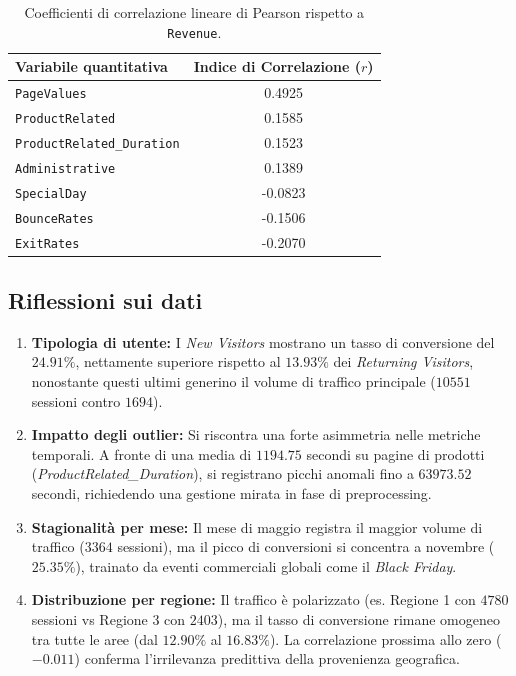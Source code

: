 \documentclass[11pt,a4paper]{article}
\begin{document}
\begin{table}[htbp]
\centering
\caption{Coefficienti di correlazione lineare di Pearson rispetto a \texttt{Revenue}.}
\label{tab:correlazioni}
\begin{tabular}{lc}
\toprule
\textbf{Variabile quantitativa} & \textbf{Indice di Correlazione ($r$)} \\
\midrule
\texttt{PageValues} & 0.4925 \\
\texttt{ProductRelated} & 0.1585 \\
\texttt{ProductRelated\_Duration} & 0.1523 \\
\texttt{Administrative} & 0.1389 \\
\texttt{SpecialDay} & -0.0823 \\
\texttt{BounceRates} & -0.1506 \\
\texttt{ExitRates} & -0.2070 \\
\bottomrule
\end{tabular}
\end{table}

\subsection{Riflessioni sui dati}

\begin{enumerate}
    \item \textbf{Tipologia di utente:} I \textit{New Visitors} mostrano un tasso di conversione del $24.91\%$, nettamente superiore rispetto al $13.93\%$ dei \textit{Returning Visitors}, nonostante questi ultimi generino il volume di traffico principale ($10551$ sessioni contro $1694$).
    
    \item \textbf{Impatto degli outlier:} Si riscontra una forte asimmetria nelle metriche temporali. A fronte di una media di $1194.75$ secondi su pagine di prodotti (\textit{ProductRelated\_Duration}), si registrano picchi anomali fino a $63973.52$ secondi, richiedendo una gestione mirata in fase di preprocessing.
    
    \item \textbf{Stagionalità per mese:} Il mese di maggio registra il maggior volume di traffico ($3364$ sessioni), ma il picco di conversioni si concentra a novembre ($25.35\%$), trainato da eventi commerciali globali come il \textit{Black Friday}.
    
    \item \textbf{Distribuzione per regione:} Il traffico è polarizzato (es. Regione 1 con $4780$ sessioni vs Regione 3 con $2403$), ma il tasso di conversione rimane omogeneo tra tutte le aree (dal $12.90\%$ al $16.83\%$). La correlazione prossima allo zero ($-0.011$) conferma l'irrilevanza predittiva della provenienza geografica.
\end{enumerate}
\end{document}
